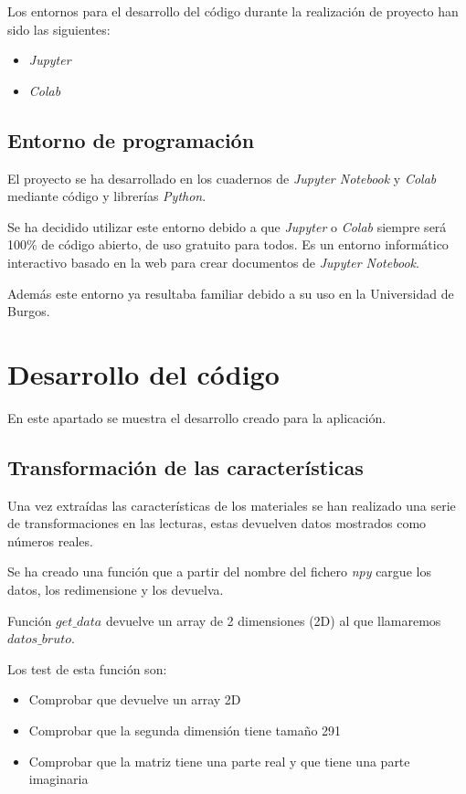 Los entornos para el desarrollo del código durante la realización de proyecto han sido las siguientes:
\begin{itemize}
\item \textit{Jupyter}
\item \textit{Colab}
\end{itemize}

\subsection{Entorno de programación}
El proyecto se ha desarrollado en los cuadernos de \textit{Jupyter Notebook} y \textit{Colab} mediante código y librerías \textit{Python}.

Se ha decidido utilizar este entorno debido a que \textit{Jupyter} o \textit{Colab} siempre será 100\% de código abierto, de uso gratuito para todos. Es un entorno informático interactivo basado en la web para crear documentos de \textit{Jupyter Notebook}.

Además este entorno ya resultaba familiar debido a su uso en la Universidad de Burgos.

\section{Desarrollo del código}

En este apartado se muestra el desarrollo creado para la aplicación.

\subsection{Transformación de las características}

Una vez extraídas las características de los materiales se han realizado una serie de transformaciones en las lecturas, estas devuelven datos mostrados como números reales.

Se ha creado una función que a partir del nombre del fichero \textit{npy} cargue los datos, los redimensione y los devuelva.

Función $get\_data$ devuelve un array de 2 dimensiones (2D) al que llamaremos $datos\_bruto$.  

Los test de esta función son: 
\begin{itemize}
\item Comprobar que devuelve un array 2D
\item Comprobar que la segunda dimensión tiene tamaño 291
\item Comprobar que la matriz tiene una parte real y que tiene una parte imaginaria
\end{itemize}

